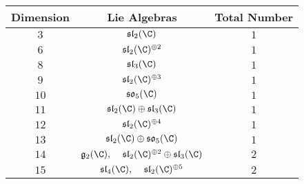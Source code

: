 \documentclass[a4paper]{article}
\begin{document}
\begin{table}[!h]
\centering
\begin{tabular}{|c|c|c|}
\hline
Dimension & Lie Algebras                                                                                                                                                    & Total Number \\ \hline
$3$       & $\mathfrak{sl}_2(\C)$                                                                                                                                           & $1$          \\
$6$       & $\mathfrak{sl}_2(\C)^{\oplus 2}$                                                                                                                                & $1$          \\
$8$       & $\mathfrak{sl}_3(\C)$                                                                                                                                           & $1$          \\
$9$       & $\mathfrak{sl}_2(\C)^{\oplus 3}$                                                                                                                                & $1$          \\
$10$      & $\mathfrak{so}_5(\C)$                                                                                                                                           & $1$          \\
$11$      & $\mathfrak{sl}_2(\C)\oplus\mathfrak{sl}_3(\C)$                                                                                                                  & $1$          \\
$12$      & $\mathfrak{sl}_2(\C)^{\oplus 4}$                                                                                                                                & $1$          \\
$13$      & $\mathfrak{sl}_2(\C)\oplus\mathfrak{so}_5(\C)$                                                                                                                  & $1$          \\
$14$      & $\mathfrak{g}_2(\C),\;\;\;\;\mathfrak{sl}_2(\C)^{\oplus 2}\oplus\mathfrak{sl}_3(\C)$                                                                            & $2$          \\
$15$      & $\mathfrak{sl}_4(\C),\;\;\;\;\mathfrak{sl}_2(\C)^{\oplus 5}$                                                                                                    & $2$          \\

\end{tabular}
\end{table}
\end{document}
